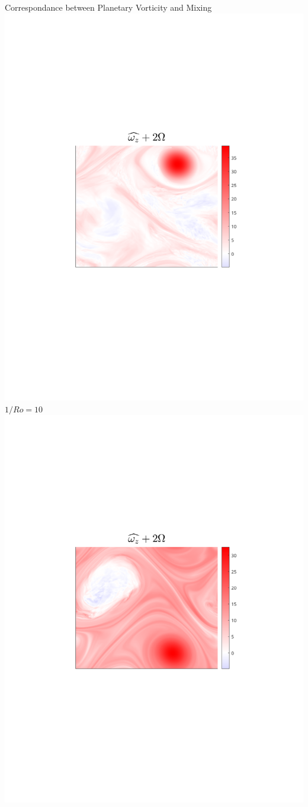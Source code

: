 \documentclass[aspecttatio=169]{beamer}
\begin{document}
\begin{frame}{Correspondance between Planetary Vorticity and Mixing}
        \includegraphics[width=1\textwidth]{images/Om3B30_vortz_bar.pdf}
    \emp
        \centering
        $1/Ro = 10$
        \includegraphics[width=1\textwidth]{images/Om10B30_vortz_bar.pdf}

\end{frame}
\end{document}
